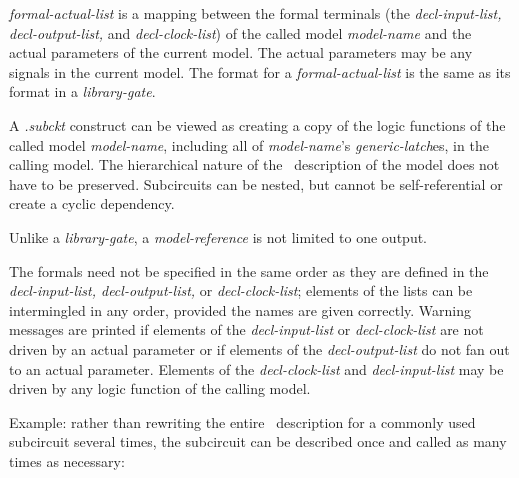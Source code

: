 {\begin{pespace}
\begin{description}
\item {\em formal-actual-list} is a mapping between the formal terminals
(the {\em decl-input-list, decl-output-list,} and {\em decl-clock-list}) of
the called model {\em model-name} and the actual parameters of the current
model.  The actual parameters may be any signals in the current model.  The
format for a {\em formal-actual-list} is the same as its format in a {\em
library-gate}.
\end{description}

A {\em .subckt} construct can be viewed as creating a copy of the logic
functions of the called model {\em model-name}, including all of {\em
model-name}'s {\em generic-latch}es, in the calling model.  The hierarchical
nature of the \BLIF\ description of the model does not have to be
preserved.  Subcircuits can be nested, but cannot be self-referential or
create a cyclic dependency.

Unlike a {\em library-gate}, a {\em model-reference} is not limited to one
output.  

The formals need not be specified in the same order as they are defined in
the {\em decl-input-list, decl-output-list,} or {\em decl-clock-list};
elements of the lists can be intermingled in any order, provided the names
are given correctly.  Warning messages are printed if elements of the {\em
decl-input-list} or {\em decl-clock-list} are not driven by an actual
parameter or if elements of the {\em decl-output-list} do not fan out to an
actual parameter.  Elements of the {\em decl-clock-list} and {\em
decl-input-list} may be driven by any logic function of the calling model.

Example: rather than rewriting the entire \BLIF\ description for a commonly
used subcircuit several times, the subcircuit can be described once and
called as many times as necessary:
    

\end{pespace}}
